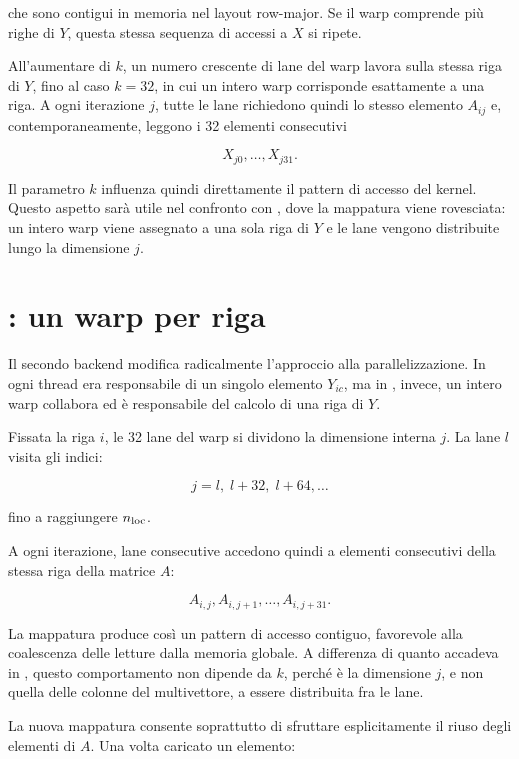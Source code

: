 che sono contigui in memoria nel layout row-major. Se il warp comprende più
righe di $Y$, questa stessa sequenza di accessi a $X$ si ripete.

All'aumentare di $k$, un numero crescente di lane del warp lavora sulla
stessa riga di $Y$, fino al caso $k=32$, in cui un intero warp corrisponde
esattamente a una riga. A ogni iterazione $j$, tutte le lane richiedono
quindi lo stesso elemento $A_{ij}$ e, contemporaneamente, leggono i 32
elementi consecutivi

\[
X_{j0}, \ldots, X_{j31}.
\]

Il parametro $k$ influenza quindi direttamente il pattern di accesso del
kernel. Questo aspetto sarà utile nel confronto con
, dove la mappatura viene rovesciata: un intero
warp viene assegnato a una sola riga di $Y$ e le lane vengono distribuite
lungo la dimensione $j$.


\section{: un warp per riga}
\label{sec:warp}

Il secondo backend modifica radicalmente l'approccio alla
parallelizzazione. In  ogni thread era responsabile
di un singolo elemento $Y_{ic}$, ma in , invece, un
intero warp collabora ed è responsabile del calcolo di una riga di $Y$.

Fissata la riga $i$, le 32 lane del warp si dividono la dimensione interna
$j$. La lane $l$ visita gli indici:

\[
j = l,\; l+32,\; l+64,\ldots
\]

fino a raggiungere $n_{\text{loc}}$.

A ogni iterazione, lane consecutive accedono
quindi a elementi consecutivi della stessa riga della matrice $A$:

\[
A_{i,j}, A_{i,j+1}, \ldots, A_{i,j+31}.
\]

La mappatura produce così un pattern di accesso contiguo, favorevole alla
coalescenza delle letture dalla memoria globale. A differenza di quanto
accadeva in , questo comportamento non dipende da
$k$, perché è la dimensione $j$, e non quella delle colonne del
multivettore, a essere distribuita fra le lane.

La nuova mappatura consente soprattutto di sfruttare esplicitamente il
riuso degli elementi di $A$. Una volta caricato un elemento:

